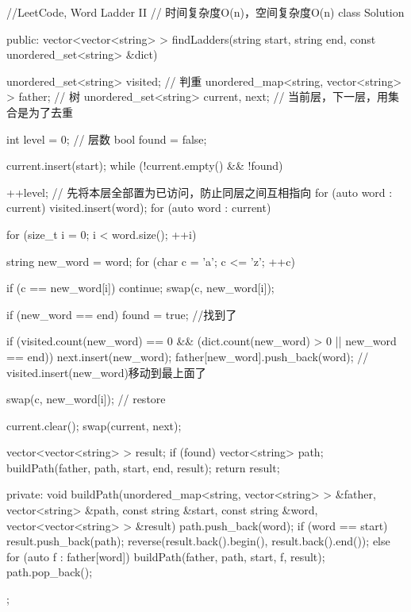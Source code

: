 \begin{Code}
//LeetCode, Word Ladder II
// 时间复杂度O(n)，空间复杂度O(n)
class Solution {
public:
    vector<vector<string> > findLadders(string start, string end,
            const unordered_set<string> &dict) {
        unordered_set<string> visited; // 判重
        unordered_map<string, vector<string> > father; // 树
        unordered_set<string> current, next;  // 当前层，下一层，用集合是为了去重

        int level = 0; // 层数
        bool found = false;

        current.insert(start);
        while (!current.empty() && !found) {
            ++level;
            // 先将本层全部置为已访问，防止同层之间互相指向
            for (auto word : current)
                visited.insert(word);
            for (auto word : current) {
                for (size_t i = 0; i < word.size(); ++i) {
                    string new_word = word;
                    for (char c = 'a'; c <= 'z'; ++c) {
                        if (c == new_word[i]) continue;
                        swap(c, new_word[i]);

                        if (new_word == end) found = true; //找到了

                        if (visited.count(new_word) == 0
                                && (dict.count(new_word) > 0 ||
                                        new_word == end)) {
                            next.insert(new_word);
                            father[new_word].push_back(word);
                            // visited.insert(new_word)移动到最上面了
                        }

                        swap(c, new_word[i]);  // restore
                    }
                }
            }

            current.clear();
            swap(current, next);
        }
        vector<vector<string> > result;
        if (found) {
            vector<string> path;
            buildPath(father, path, start, end, result);
        }
        return result;
    }
private:
    void buildPath(unordered_map<string, vector<string> > &father,
            vector<string> &path, const string &start, const string &word,
            vector<vector<string> > &result) {
        path.push_back(word);
        if (word == start) {
            result.push_back(path);
            reverse(result.back().begin(), result.back().end());
        } else {
            for (auto f : father[word]) {
                buildPath(father, path, start, f, result);
            }
        }
        path.pop_back();
    }
};
\end{Code}


